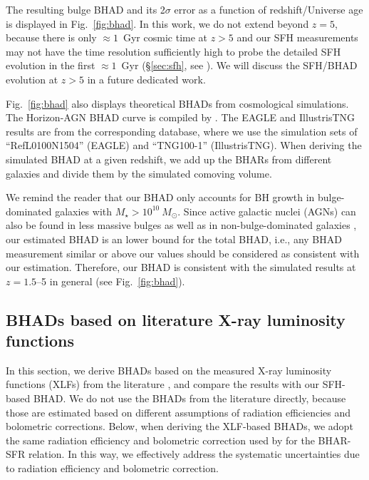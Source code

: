 \documentclass[twocolumn,twocolappendix,times]{aastex63}
\newcommand{\mstar}{M_{\star}} %
\newcommand{\fst}[1]{#1}
\begin{document}
\begin{CJK*}{UTF8}{gbsn}

The resulting bulge BHAD and its 2$\sigma$ error as a function of redshift/Universe age is displayed in Fig.~\ref{fig:bhad}. 
In this work, we do not extend beyond $z=5$, because there is only $\approx 1$~Gyr cosmic time at $z>5$ and our SFH measurements may not have the time resolution sufficiently high to probe the detailed SFH evolution in the first $\approx 1$~Gyr (\S\ref{sec:sfh}, see \citealt{estrada_carpenter19,estrada_carpenter20}). 
We will discuss the SFH/BHAD evolution at $z>5$ in a future dedicated work.

Fig.~\ref{fig:bhad} also displays theoretical BHADs from cosmological simulations. 
The Horizon-AGN BHAD curve \citep{volonteri16} is compiled by \cite{vito18}. 
The EAGLE \citep{crain15, schaye15} and IllustrisTNG \citep{weinberger17, pillepich18} results are from the corresponding database, where we use the simulation sets of ``RefL0100N1504'' (EAGLE) and ``TNG100-1'' (IllustrisTNG).
When deriving the simulated BHAD at a given redshift, we add up the BHARs from different galaxies and divide them by the simulated comoving volume. 

We remind the reader that our BHAD only accounts for BH growth in bulge-dominated galaxies with $\mstar > 10^{10}\ M_\odot$.
Since active galactic nuclei (AGNs) can also be found in 
less massive bulges as well as in non-bulge-dominated 
galaxies \citep[e.g.,][]{yang19}, our estimated BHAD is 
an lower bound for the total BHAD, i.e., any BHAD measurement similar or above our values should be considered as consistent with our estimation. 
Therefore, our BHAD is consistent with the simulated results at $z=1.5$--5 in general (see Fig.~\ref{fig:bhad}).


\subsection{BHADs based on literature X-ray luminosity functions}
\label{sec:xlf_bhad}
\fst{In this section, we derive BHADs based on the measured X-ray luminosity functions (XLFs) from the literature \citep[i.e.,][]{ueda14, aird15, vito18, ananna19}, and compare the results with our SFH-based BHAD. 
We do not use the BHADs from the literature directly, because those are estimated based on different assumptions of radiation efficiencies and bolometric corrections.
Below, when deriving the XLF-based BHADs, we adopt the same radiation efficiency and bolometric correction used by \cite{yang19} for the BHAR-SFR relation. 
In this way, we effectively address the systematic uncertainties due to radiation efficiency and bolometric correction.
}


\end{CJK*}
\end{document}
